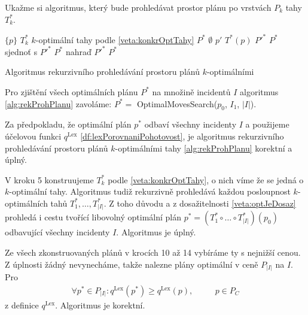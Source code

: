 Ukažme si algoritmus, který bude prohledávat prostor plánu po vrstvách $P_k$ tahy $T^*_k$.

\begin{algorithm}[h]
  \begin{algorithmic}[1]
      \State \Return $\{ p \}$
    \EndIf
    \State $T^*_k$ \gets $k$-optimální tahy podle \ref{veta:konkrOptTahy}
    \State $P^*$ \gets $\emptyset$
      \State $p'$ \gets $T^*(p)$
      \State $P'^*$ \gets {}
        \State $P^*$ sjednoť s $P'^*$
        \State $P^*$ nahraď $P'^*$
      \EndIf
    \EndFor
    \State \Return $P^*$
  \EndFunction
  \end{algorithmic}
  \caption{Algoritmus rekurzivního prohledávání prostoru plánů $k$-optimálními}
  \label{alg:rekProhPlanu}
\end{algorithm}

Pro zjištění všech optimálních plánu $P^*$ na množině incidentů $I$ algoritmus \ref{alg:rekProhPlanu} zavoláme: $P^* = $ OptimalMovesSearch($p_0$, $I_1$, $|I|$).

\begin{veta}\label{veta:algoritmusPredpoklady}
  Za předpokladu, že optimální plán $p^*$ odbaví všechny incidenty $I$ a použijeme účelovou funkci $q^{\text{Lex}}$ \ref{df:lexPorovnaniPohotovost},
  je algoritmus rekurzivního prohledávání prostoru plánů $k$-optimálními tahy \ref{alg:rekProhPlanu} korektní a úplný.
\end{veta}
\begin{dukaz}
  V kroku 5 konstruujeme $T^*_k$ podle \ref{veta:konkrOptTahy}, o nich víme že se jedná o $k$-optimální tahy.
  Algoritmus tudiž rekurzivně prohledává každou posloupnost $k$-optimálních tahů $T^*_1, \dots, T^*_{|I|}$.
  Z toho důvodu a z dosažitelnosti \ref{veta:optJeDosaz} prohledá i cestu tvořící libovolný optimální plán $p^* = (T^*_1 \circ \dots \circ T^*_{|I|})(p_0)$ odbavující všechny incidenty $I$.
  Algoritmus je úplný.

  Ze všech zkonstruovaných plánů v krocích 10 až 14 vybíráme ty s nejnižší cenou.
  Z úplnosti žádný nevynecháme, takže nalezne plány optimální v ceně $P_{|I|}$ na $I$.
  Pro
  \begin{alignat*}
    \forall p^* \in P_{|I|} \colon q^{\text{Lex}}(p^*) \geq q^{\text{Lex}}(p), \quad && p \in P_C
  \end{alignat*}
  z definice $q^{\text{Lex}}$. Algoritmus je korektní.
\end{dukaz}

